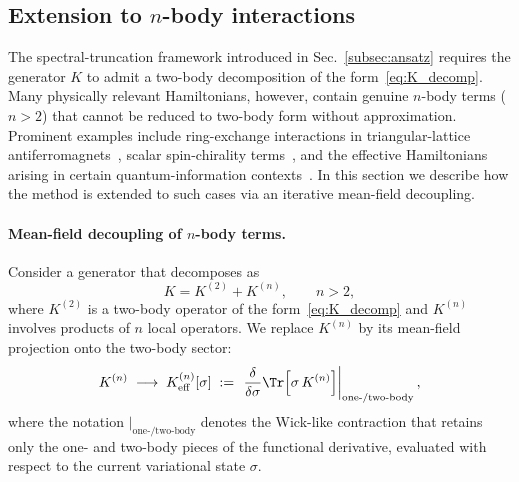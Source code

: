 

\subsection{Extension to \texorpdfstring{$n$}{n}-body interactions}
\label{subsec:nbody}

The spectral-truncation framework introduced in Sec.~\ref{subsec:ansatz}
requires the generator $K$ to admit a two-body decomposition of the
form~\eqref{eq:K_decomp}.
Many physically relevant Hamiltonians, however, contain genuine $n$-body
terms ($n > 2$) that cannot be reduced to two-body form without approximation.
Prominent examples include ring-exchange interactions in triangular-lattice
antiferromagnets~\cite{Motrunich2005}, scalar spin-chirality
terms~\cite{Wen1989}, and the effective Hamiltonians arising in
certain quantum-information contexts~\cite{Abanin2019}.
In this section we describe how the method is extended to such cases via
an iterative mean-field decoupling.

\paragraph{Mean-field decoupling of $n$-body terms.}
Consider a generator that decomposes as
\begin{equation}
  K = K^{(2)} + K^{(n)},
  \qquad n > 2,
  \label{eq:K_nbody}
\end{equation}
where $K^{(2)}$ is a two-body operator of the form~\eqref{eq:K_decomp} and
$K^{(n)}$ involves products of $n$ local operators.
We replace $K^{(n)}$ by its mean-field projection onto the two-body sector:
\begin{equation}
  K^{(n)} \;\longrightarrow\; K^{(n)}_{\rm eff}[\sigma]
  \;:=\; \left.\frac{\delta}{\delta \sigma}
  \Tr\!\left[\sigma\, K^{(n)}\right]\right|_{\text{one-/two-body}},
  \label{eq:mf_decoupling}
\end{equation}
where the notation $|_{\text{one-/two-body}}$ denotes the Wick-like
contraction that retains only the one- and two-body pieces of the functional
derivative, evaluated with respect to the current variational state $\sigma$.

